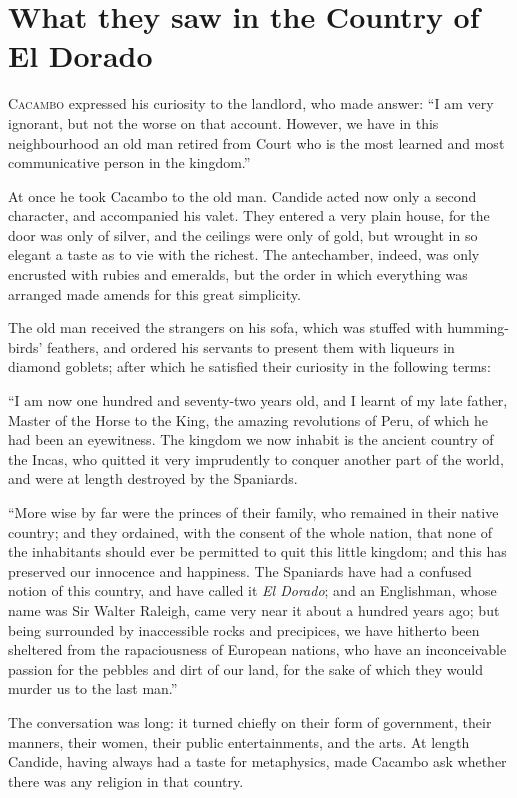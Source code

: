 \chapter{What they saw in the Country of El Dorado}
\vspace{-1cm}

\lettrine[lraise=0.1,slope=-.5em]{C}{acambo} expressed his curiosity to the landlord, who made answer:
``I am very ignorant, but not the worse on that account. However, we have in this neighbourhood an old man retired from Court who is the most learned and most communicative person in the kingdom.''

At once he took Cacambo to the old man. Candide acted now only a second character, and accompanied his valet. They entered a very plain house, for the door was only of silver, and the ceilings were only of gold, but wrought in so elegant a taste as to vie with the richest. The antechamber, indeed, was only encrusted with rubies and emeralds, but the order in which everything was arranged made amends for this great simplicity.

The old man received the strangers on his sofa, which was stuffed with humming-birds' feathers, and ordered his servants to present them with liqueurs in diamond goblets; after which he satisfied their curiosity in the following terms:

``I am now one hundred and seventy-two years old, and I learnt of my late father, Master of the Horse to the King, the amazing revolutions of Peru, of which he had been an eyewitness. The kingdom we now inhabit is the ancient country of the Incas, who quitted it very imprudently to conquer another part of the world, and were at length destroyed by the Spaniards.

``More wise by far were the princes of their family, who remained in their native country; and they ordained, with the consent of the whole nation, that none of the inhabitants should ever be permitted to quit this little kingdom; and this has preserved our innocence and happiness. The Spaniards have had a confused notion of this country, and have called it \textit{El Dorado}; and an Englishman, whose name was Sir Walter Raleigh, came very near it about a hundred years ago; but being surrounded by inaccessible rocks and precipices, we have hitherto been sheltered from the rapaciousness of European nations, who have an inconceivable passion for the pebbles and dirt of our land, for the sake of which they would murder us to the last man.''

The conversation was long: it turned chiefly on their form of government, their manners, their women, their public entertainments, and the arts. At length Candide, having always had a taste for metaphysics, made Cacambo ask whether there was any religion in that country.

